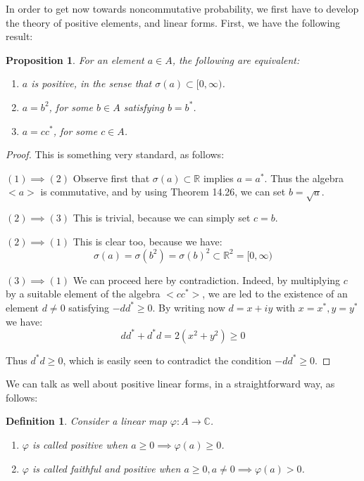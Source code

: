 \documentclass[12pt]{amsbook}
\newtheorem{definition}[theorem]{Definition}
\newtheorem{proposition}[theorem]{Proposition}
\begin{document}
In order to get now towards noncommutative probability, we first have to develop the theory of positive elements, and linear forms. First, we have the following result:

\begin{proposition}
For an element $a\in A$, the following are equivalent:
\begin{enumerate}
\item $a$ is positive, in the sense that $\sigma(a)\subset[0,\infty)$.

\item $a=b^2$, for some $b\in A$ satisfying $b=b^*$.

\item $a=cc^*$, for some $c\in A$.
\end{enumerate}
\end{proposition}

\begin{proof}
This is something very standard, as follows:

\medskip

$(1)\implies(2)$ Observe first that $\sigma(a)\subset\mathbb R$ implies $a=a^*$. Thus the algebra $<a>$ is commutative, and by using Theorem 14.26, we can set $b=\sqrt{a}$.

\medskip

$(2)\implies(3)$ This is trivial, because we can simply set $c=b$. 

\medskip

$(2)\implies(1)$ This is clear too, because we have:
$$\sigma(a)
=\sigma(b^2)
=\sigma(b)^2\subset\mathbb R^2
=[0,\infty)$$

$(3)\implies(1)$ We can proceed here by contradiction. Indeed, by multiplying $c$ by a suitable element of the algebra $<cc^*>$, we are led to the existence of an element $d\neq0$ satisfying $-dd^*\geq0$. By writing now $d=x+iy$ with $x=x^*,y=y^*$ we have:
$$dd^*+d^*d
=2(x^2+y^2)
\geq0$$

Thus $d^*d\geq0$, which is easily seen to contradict the condition $-dd^*\geq0$.
\end{proof}

We can talk as well about positive linear forms, in a straightforward way, as follows:

\begin{definition}
Consider a linear map $\varphi:A\to\mathbb C$.
\begin{enumerate}
\item $\varphi$ is called positive when $a\geq0\implies\varphi(a)\geq0$.

\item $\varphi$ is called faithful and positive when $a\geq0,a\neq0\implies\varphi(a)>0$.
\end{enumerate}
\end{definition}
\end{document}
